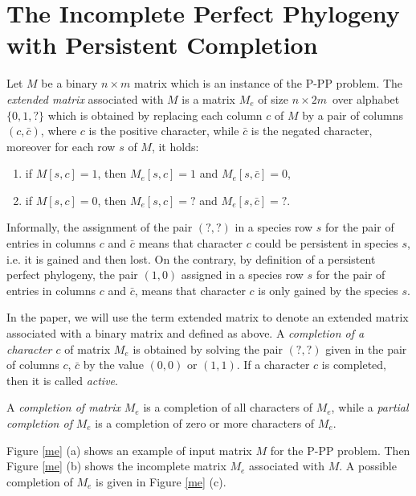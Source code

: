 \documentclass{llncs}
\newcommand{\me}{{$M_e$} }
\newcommand{\mec}{{$M_e$}, }
\newcommand{\med}{{$ M_e$}. }
\begin{document}
\section{The Incomplete  Perfect Phylogeny with Persistent Completion}


Let $M$ be a binary $n \times m$ matrix which is an
instance of the P-PP problem. The  {\em extended matrix} associated with $M$ is a matrix \me of size ${n \times 2m}$\ over alphabet $\{0,1,?\}$  which is obtained by replacing each column $c$ of $M$ by a pair of columns $(c, \bar{c})$, where $c$ is the positive character, while $\bar{c}$ is the negated character,  moreover for each   row $s$  of $M$, it holds:


\begin{enumerate}
 

\item    if $M[s,c] = 1$, then  $M_e[s,c] = 1$ and $M_e[s,\bar{c}] = 0$,

\item    if $M[s,c] = 0$, then  $M_e[s,c] = ?$ and $M_e[s,\bar{c}] = ?$.
\end{enumerate}






Informally, the assignment of the pair $(?,?)$ in a species row $s$ for the pair of   entries in columns $c$ and $\bar{c}$ means that character $c$ could be persistent in species $s$, i.e. it is gained and then lost. On the contrary, by definition of a persistent perfect phylogeny,  the pair $(1,0)$ assigned in  a species  row $s$ for the pair of   entries in columns $c$ and $\bar{c}$, means that character $c$ is only gained by the species $s$.

In the paper, we will use  the term extended matrix to denote an extended matrix associated with a binary matrix and defined as above. 
A {\em completion  of  a character $c$}   of matrix \me  is
 obtained by solving the pair $(?,?)$ given in  the pair of columns   $c$, 
$\bar{c}$     by the   value $(0,0)$ or
$(1,1)$.   If a character  $c$ is completed,  then it is  called {\em active}. 


A  {\em completion  of matrix}   \me is a completion
of all characters of \mec while a {\em partial completion  of} \me
is a completion of zero  or more  characters of \med


Figure \ref{me} (a) shows an example of  input  matrix $M$ for the P-PP problem. Then Figure \ref{me} (b) shows the incomplete  matrix \me associated with $M$. A possible completion of \me is given in  Figure \ref{me} (c). 
\end{document}
